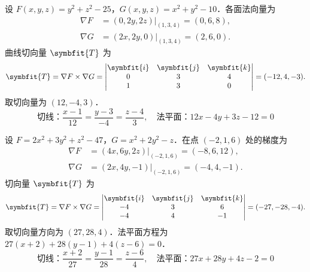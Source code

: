 \begin{solution}

    设 $F(x, y, z) = y^2 + z^2 - 25$，$G(x, y, z) = x^2 + y^2 - 10$．各面法向量为
    \begin{equation}
        \begin{aligned}
            \nabla F & = (0, 2y, 2z) \big|_{(1, 3, 4)} = (0, 6, 8), \\
            \nabla G & = (2x, 2y, 0) \big|_{(1, 3, 4)} = (2, 6, 0).
        \end{aligned}
    \end{equation}
    曲线切向量 $\symbfit{T}$ 为
    \begin{equation}
        \symbfit{T} = \nabla F \times \nabla G = \begin{vmatrix} \symbfit{i} & \symbfit{j} & \symbfit{k} \\ 0 & 3 & 4 \\ 1 & 3 & 0 \end{vmatrix} = (-12, 4, -3).
    \end{equation}
    取切向量为 $(12, -4, 3)$．
    \begin{equation}
        \boxed{\text{切线：} \frac{x-1}{12} = \frac{y-3}{-4} = \frac{z-4}{3}, \quad \text{法平面：} 12x - 4y + 3z - 12 = 0}
    \end{equation}


    设 $F = 2x^2 + 3y^2 + z^2 - 47$，$G = x^2 + 2y^2 - z$．在点 $(-2, 1, 6)$ 处的梯度为
    \begin{equation}
        \begin{aligned}
            \nabla F & = (4x, 6y, 2z) \big|_{(-2, 1, 6)} = (-8, 6, 12), \\
            \nabla G & = (2x, 4y, -1) \big|_{(-2, 1, 6)} = (-4, 4, -1).
        \end{aligned}
    \end{equation}
    切向量 $\symbfit{T}$ 为
    \begin{equation}
        \symbfit{T} = \nabla F \times \nabla G = \begin{vmatrix} \symbfit{i} & \symbfit{j} & \symbfit{k} \\ -4 & 3 & 6 \\ -4 & 4 & -1 \end{vmatrix} = (-27, -28, -4).
    \end{equation}
    取切向量方向为 $(27, 28, 4)$．法平面方程为 $27(x+2) + 28(y-1) + 4(z-6) = 0$．
    \begin{equation}
        \boxed{\text{切线：} \frac{x+2}{27} = \frac{y-1}{28} = \frac{z-6}{4}, \quad \text{法平面：} 27x + 28y + 4z - 2 = 0}
    \end{equation}
\end{solution}

